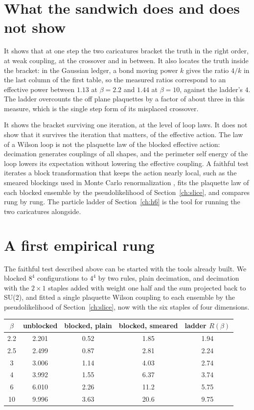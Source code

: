 \section{What the sandwich does and does not show}

It shows that at one step the two caricatures bracket the truth in the right order, at weak coupling, at the crossover and in between. It also locates the truth inside the bracket: in the Gaussian ledger, a bond moving power $k$ gives the ratio $4/k$ in the last column of the first table, so the measured ratios correspond to an effective power between $1.13$ at $\beta=2.2$ and $1.44$ at $\beta=10$, against the ladder's $4$. The ladder overcounts the off plane plaquettes by a factor of about three in this measure, which is the single step form of its misplaced crossover.

It shows the bracket surviving one iteration, at the level of loop laws. It does not show that it survives the iteration that matters, of the effective action. The law of a Wilson loop is not the plaquette law of the blocked effective action: decimation generates couplings of all shapes, and the perimeter self energy of the loop lowers its expectation without lowering the effective coupling. A faithful test iterates a block transformation that keeps the action nearly local, such as the smeared blockings used in Monte Carlo renormalization \cite{Sw79}, fits the plaquette law of each blocked ensemble by the pseudolikelihood of Section~\ref{ch:slice}, and compares rung by rung. The particle ladder of Section~\ref{ch:h6} is the tool for running the two caricatures alongside.

\section{A first empirical rung}

The faithful test described above can be started with the tools already built. We blocked $8^4$ configurations to $4^4$ by two rules, plain decimation, and decimation with the $2\times1$ staples added with weight one half and the sum projected back to SU(2), and fitted a single plaquette Wilson coupling to each ensemble by the pseudolikelihood of Section~\ref{ch:slice}, now with the six staples of four dimensions.

\begin{center}
\small
\begin{tabular}{ccccc}
\toprule
$\beta$ & unblocked & blocked, plain & blocked, smeared & ladder $R(\beta)$ \\ \midrule
2.2 & 2.201 & 0.52 & 1.85 & 1.94 \\
2.5 & 2.499 & 0.87 & 2.81 & 2.24 \\
3 & 3.006 & 1.14 & 4.03 & 2.74 \\
4 & 3.992 & 1.55 & 6.37 & 3.74 \\
6 & 6.010 & 2.26 & 11.2 & 5.75 \\
10 & 9.996 & 3.63 & 20.6 & 9.75 \\
\bottomrule
\end{tabular}
\end{center}


